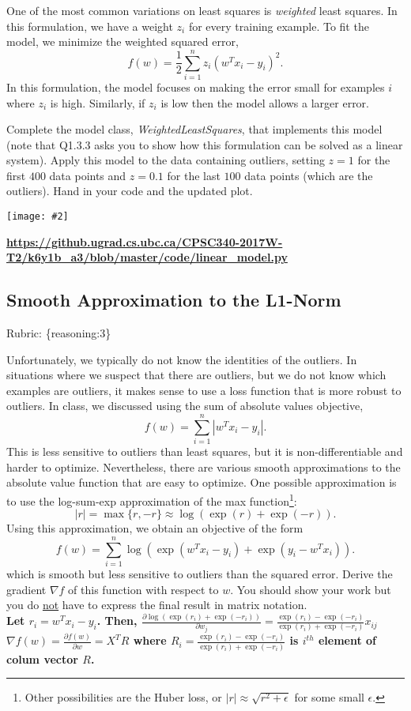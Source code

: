 \documentclass{article}
\def\rubric#1{\gre{Rubric: \{#1\}}}{}
\def\blu#1{{\color{blu}#1}}
\def\gre#1{{\color{gre}#1}}
\newcommand{\centerfig}[2]{\begin{center}\texttt{[image: \#2]}\end{center}}
\begin{document}
One of the most common variations on least squares is \emph{weighted} least squares. In this formulation, we have a weight $z_i$ for every training example. To fit the model, we minimize the weighted squared error,
\[
f(w) =  \frac{1}{2}\sum_{i=1}^n z_i(w^Tx_i - y_i)^2.
\]
In this formulation, the model focuses on making the error small for examples $i$ where $z_i$ is high. Similarly, if $z_i$ is low then the model allows a larger error.

Complete the model class, \emph{WeightedLeastSquares}, that implements this model
(note that Q1.3.3 asks you to show how this formulation can be solved as a linear system).
Apply this model to the data containing outliers, setting $z = 1$ for the first
$400$ data points and $z = 0.1$ for the last $100$ data points (which are the outliers).
\blu{Hand in your code and the updated plot}.
\centerfig{.5}{../figs/least_squares_outliers_weighted.pdf}
\textbf{\url{https://github.ugrad.cs.ubc.ca/CPSC340-2017W-T2/k6y1b_a3/blob/master/code/linear_model.py}}
\subsection{Smooth Approximation to the L1-Norm}
\rubric{reasoning:3}

Unfortunately, we typically do not know the identities of the outliers. In situations where we suspect that there are outliers, but we do not know which examples are outliers, it makes sense to use a loss function that is more robust to outliers. In class, we discussed using the sum of absolute values objective,
\[
f(w) = \sum_{i=1}^n |w^Tx_i - y_i|.
\]
This is less sensitive to outliers than least squares, but it is non-differentiable and harder to optimize. Nevertheless, there are various smooth approximations to the absolute value function that are easy to optimize. One possible approximation is to use the log-sum-exp approximation of the max function\footnote{Other possibilities are the Huber loss, or $|r|\approx \sqrt{r^2+\epsilon}$ for some small $\epsilon$.}:
\[
|r| = \max\{r, -r\} \approx \log(\exp(r) + \exp(-r)).
\]
Using this approximation, we obtain an objective of the form
\[
f(w) {=} \sum_{i=1}^n  \log\left(\exp(w^Tx_i - y_i) + \exp(y_i - w^Tx_i)\right).
\]
which is smooth but less sensitive to outliers than the squared error. \blu{Derive
 the gradient $\nabla f$ of this function with respect to $w$. You should show your work but you do \underline{not} have to express the final result in matrix notation.}\\
\textbf{Let $r_i=w^Tx_i - y_i$. Then, $\frac{\partial\log\left(\exp(r_i) + \exp(-r_i)\right)}{\partial w_j}=\frac{\exp(r_i)-\exp(-r_i)}{\exp(r_i) + \exp(-r_i)}x_{ij}$\\
$\nabla f(w)=\frac{\partial f(w)}{\partial w}=X^TR$ where $R_i=\frac{\exp(r_i)-\exp(-r_i)}{\exp(r_i) + \exp(-r_i)}$ is $i^{th}$ element of colum vector $R$.}
\end{document}
